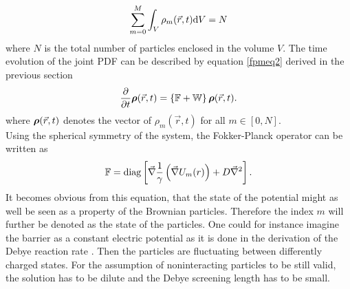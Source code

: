 \begin{equation}
    \sum\limits_{m=0}^{M} \int_V \rho_m(\vec{r},t) {\rm d}V = N
    \label{densNormalization}
\end{equation}
where $N$ is the total number of particles enclosed in the volume $V$. The time evolution of the joint PDF can be described by equation \eqref{fpmeq2} derived in the previous section
\begin{equation}
    \frac{\partial}{\partial t}\boldsymbol{\mathbf{\rho}}(\vec{r},t) = \left\{ \mathbb{F} + \mathbb{W} \right\} \boldsymbol{\mathbf{\rho}}(\vec{r},t).
    \label{fpmeq3}
\end{equation}
where $\boldsymbol{\mathbf{\rho}}(\vec{r},t)$ denotes the vector of $\rho_m(\vec{r},t)$ for all $m \in [0,N]$. \\
Using the spherical symmetry of the system, the Fokker-Planck operator can be written as
\begin{equation}
    \mathbb{F} = {\rm diag}\left[ \vec{\nabla}\frac{1}{\gamma}\left( \vec{\nabla} U_m(r) \right)+ D \vec{\nabla}^{2} \right].
    \label{fpo2}
\end{equation}
It becomes obvious from this equation, that the state of the potential might as well be seen as a property of the Brownian particles. Therefore the index $m$ will further be denoted as the state of the particles. One could for instance imagine the barrier as a constant electric potential as it is done in the derivation of the Debye reaction rate \cite{Debye1942}. Then the particles are fluctuating between differently charged states. For the assumption of noninteracting particles to be still valid, the solution has to be dilute and the Debye screening length has to be small. \\
